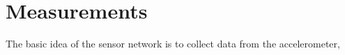 \chapter{Measurements}
\label{chp:measurements}

The basic idea of the sensor network is to collect data from the accelerometer, 